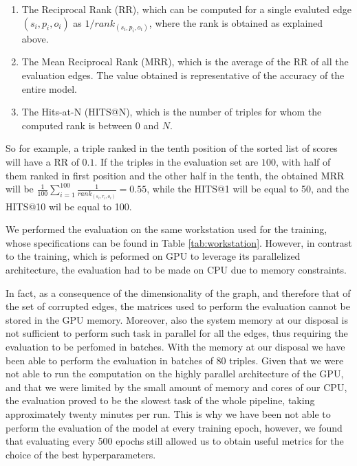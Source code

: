 \documentclass[%
    corpo=13.5pt,
    twoside,
    oldstyle,
    tipotesi=magistrale,
    greek,
    evenboxes
]{toptesi}
\begin{document}
\begin{enumerate}
    \item The Reciprocal Rank (RR), which can be computed for a single
        evaluted edge $(s_i,p_i,o_i)$ as $1/rank_{(s_i,p_i,o_i)}$, where the
        rank is obtained as explained above.
    \item The Mean Reciprocal Rank (MRR), which is the average of the
        RR of all the evaluation edges. The value obtained is representative
        of the accuracy of the entire model.
    \item The Hits-at-N (HITS@N), which is the number of triples for whom the computed
        rank is between $0$ and $N$.
\end{enumerate}

So for example, a triple ranked in the tenth position of the sorted list of
scores will have a RR of $0.1$. If the triples in the evaluation set are $100$,
with half of them ranked in first position and the other half in the tenth, the
obtained MRR will be
$\frac{1}{100} \sum_{i=1}^{100} \frac{1}{rank_{(s_i,r_i,o_i)}} = 0.55$,
while the HITS@1 will be equal to 50, and the HITS@10 wil be
equal to 100.
\newline

We performed the evaluation on the same workstation used for the training,
whose specifications can be found in Table \ref{tab:workstation}.
However, in contrast to the training, which is peformed on GPU to leverage its
parallelized architecture, the evaluation had to be made on CPU due to memory
constraints.

In fact, as a consequence of the dimensionality of the graph, and therefore
that of the set of corrupted edges, the matrices used to perform the
evaluation cannot be stored in the GPU memory.
Moreover, also the system memory at our disposal is not sufficient to perform
such task in parallel for all the edges, thus requiring the evaluation to be
perfomed in batches.
With the memory at our disposal we have been able to perform the evaluation in
batches of 80 triples.
Given that we were not able to run the computation on the highly parallel
architecture of the GPU, and that we were limited by the small amount of memory
and cores of our CPU, the evaluation proved to be the slowest task of the
whole pipeline, taking approximately twenty minutes per run.
This is why we have been not able to perform the evaluation of the model at
every training epoch, however, we found that evaluating every 500 epochs still
allowed us to obtain useful metrics for the choice of the best hyperparameters.
\end{document}
